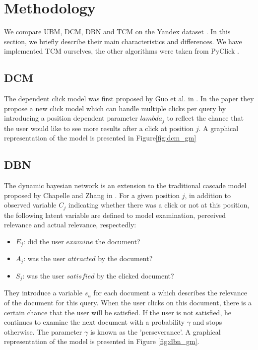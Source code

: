 \section{Methodology}
\label{sec:methodology}
We compare UBM, DCM, DBN and TCM on the Yandex dataset \cite{yandex}. In this section, we briefly describe their main characteristics and differences. We have implemented TCM ourselves, the other algorithms were taken from PyClick \cite{PyClick}.

\subsection{DCM}
The dependent click model was first proposed by Guo et al. in \cite{Guo2009}. In the paper they propose a new click model which can handle multiple clicks per query by introducing a position dependent parameter $lambda_j$ to reflect the chance that the user would like to see more results after a click at position $j$. A graphical representation of the model is presented in Figure\ref{fig:dcm_gm} 

\subsection{DBN}
The dynamic bayesian network is an extension to the traditional cascade model proposed by Chapelle and Zhang in \cite{Zhang2011}. For a given position $j$, in addition to observed variable $C_j$ indicating whether there was a click or not at this position, the following latent variable are defined to model examination, perceived relevance and actual relevance, respectedly:
\begin{itemize}
	\item $E_j$: did the user $examine$ the document?
	\item $A_j$: was the user $attracted$ by the document?
	\item $S_j$: was the user $satisfied$ by the clicked document?
\end{itemize}
They introduce a variable $s_u$ for each document $u$ which describes the relevance of the document for this query. When the user clicks on this document, there is a certain chance that the user will be satisfied. If the user is not satisfied, he continues to examine the next document with a probability $\gamma$ and stops otherwise. The parameter $\gamma$ is known as the 'perseverance'. A graphical representation of the model is presented in Figure \ref{fig:dbn_gm}. 

